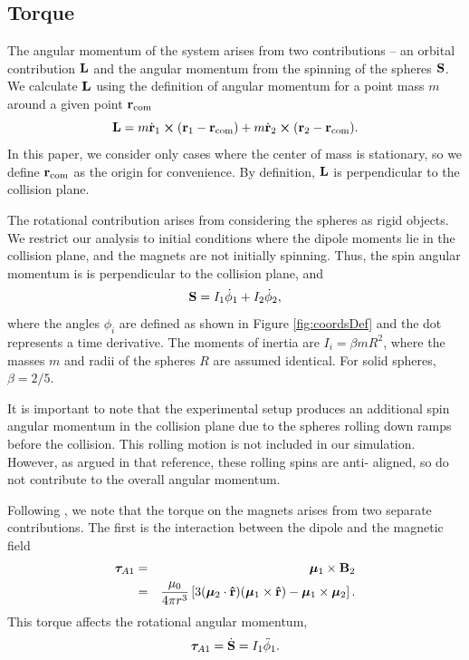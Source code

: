 \documentclass{article}
\begin{document}
\subsection{Torque}
The angular momentum of the system arises from two contributions --  an orbital contribution $\vb{L} $ and the angular momentum from the spinning of the spheres $ \vb{S}$.
We calculate $\vb{L}$ using the definition of angular momentum for a point mass $m$ around a given point $\vb{r}_\mathrm{com}$
\begin{equation}
     \vb{L} = m \Dot{\vb{r}}_1 \cross (\vb{r}_1-\vb{r}_\mathrm{com}) +m \Dot{\vb{r}}_2 \cross (\vb{r}_2-\vb{r}_\mathrm{com}).
\end{equation}
In this paper, we consider only cases where the center of mass is stationary, so we define $\vb{r}_\mathrm{com}$ as the origin for convenience. By definition, $\vb{L}$ is perpendicular to the collision plane.

The rotational contribution arises from considering the spheres as rigid objects. We restrict our analysis to initial conditions where the dipole moments lie in the collision plane, and the magnets are not initially spinning. Thus, the spin angular momentum is is perpendicular to the collision plane, and 
\begin{equation}
    \vb{S} = I_1 \Dot{\phi}_1 +I_2 \Dot{\phi}_2,
\end{equation}
where the angles $\phi_i$ are defined as shown in Figure \ref{fig:coordsDef} and the dot represents a time derivative. The moments of inertia are $I_i=\beta m R^2$, where the masses $m$ and radii of the spheres $R$ are assumed identical. For solid spheres, $\beta=2/5$.

It is important to note that the experimental setup \cite{Lindn2018} produces an additional spin angular momentum in the collision plane due to the spheres rolling down ramps before the collision. This rolling motion is not included in our simulation. However, as argued in that reference, these rolling spins are anti- aligned, so do not contribute to the overall angular momentum.

Following \cite{Edwards2017a}, we note that the torque on the magnets arises from two separate contributions. The first is the interaction between the dipole and the magnetic field
\begin{eqnarray}
        \boldsymbol\tau_{A1} &=&     \bm{\mu}_1\times \vb{B}_2 \nonumber \\
        &=& \frac{\mu_0}{4\pi r^3} \left[3(\bm{\mu}_2\cdot\vu{r})(    \bm{\mu}_1 \times \vu{r}) -    \bm{\mu}_1 \times     \bm{\mu}_2 \right]. \label{eq:torqueA}
\end{eqnarray}
This torque affects the rotational angular momentum,
\begin{equation}
    \bm{\tau}_{A1}=\Dot{\vb{S}}=I_1\Ddot{\phi}_1.
\end{equation}
\end{document}
